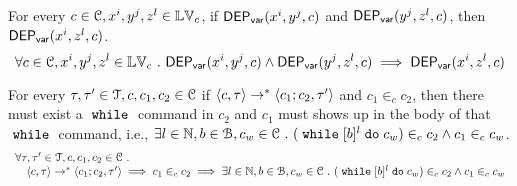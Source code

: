 %
%
\begin{lem}
	\label{lem:vardep_trans}
For every $c \in \mathcal{C}, x^i, y^j, z^l \in \mathbb{LV}_c$, 
if $\mathsf{DEP_{var}}(x^i, y^j, c)$ and 
$\mathsf{DEP_{var}}(y^j, z^l, c)$, then $\mathsf{DEP_{var}}(x^i, z^l, c)$.
	\[
	\forall c \in \mathcal{C}, x^i, y^j, z^l \in \mathbb{LV}_c ~.~ 
	\mathsf{DEP_{var}}(x^i, y^j, c) 
	\land
	\mathsf{DEP_{var}}(y^j, z^l, c) 
	\implies
	\mathsf{DEP_{var}}(x^i, z^l, c)
	\]
  \end{lem}
\begin{lem}
\label{lem:inv_while}
For every $\mathtt{\tau}, \mathtt{\tau}' \in \mathcal{T}, c, c_1, c_2 \in \mathcal{C}$ 
if $ \langle c, \mathtt{\tau} \rangle \rightarrow^* \langle c_1; c_2, \mathtt{\tau}' \rangle$ and 
$c_1 \in_c c_2$, 
then there must exist a $\;\mathtt{while}\;$ command in $c_2$ and $c_1$ must shows up in the body of that $\;\mathtt{while}\;$ command,
 i.e., $\exists l \in \mathbb{N}, b \in \mathcal{B}, c_w \in \mathcal{C} ~.~ 
(\;\mathtt{while}\; [b]^l \;\mathtt{do}\; c_w) \in_c c_2 \land c_1 \in_c c_w$.
%
\[
\begin{array}{l}
\forall \mathtt{\tau}, \mathtt{\tau}' \in \mathcal{T}, c, c_1, c_2 \in \mathcal{C} ~.~
	\\ \quad
	\langle c, \mathtt{\tau} \rangle \rightarrow^* \langle c_1; c_2, \mathtt{\tau}' \rangle
	\implies
	c_1 \in_c c_2
	\implies
	\exists l \in \mathbb{N}, b \in \mathcal{B}, c_w \in \mathcal{C} ~.~ 
	(\;\mathtt{while}\; [b]^l \;\mathtt{do}\; c_w) \in_c c_2 \land c_1 \in_c c_w
\end{array}
\]
\end{lem}
%
